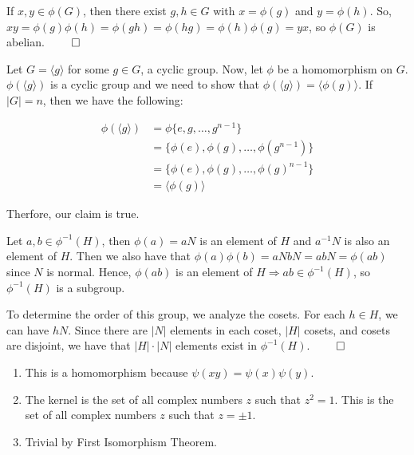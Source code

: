 \documentclass[12pt]{report}
\begin{document}
\sol If $x, y \in \phi(G)$, then there exist $g, h \in G$ with $x = \phi(g)$ and $y=\phi(h)$. So, $xy = \phi(g)\phi(h) = \phi(gh) = \phi(hg) = \phi(h)\phi(g) = yx$, so $\phi(G)$ is abelian. $\qed$

\sol Let $G = \langle g \rangle$ for some $g \in G$, a cyclic group. Now, let $\phi$ be a homomorphism on $G$. $\phi(\langle g \rangle)$ is a cyclic group and we need to show that $\phi(\langle g \rangle) = \langle \phi(g) \rangle$. If $|G| = n$, then we have the following:

\begin{align*}
    \phi(\langle g \rangle) &= \phi\{e, g, \ldots, g^{n-1}\}\\
    &= \{\phi(e), \phi(g), \ldots, \phi(g^{n-1})\} \\
    &= \{\phi(e), \phi(g), \ldots, \phi(g)^{n-1}\} \\
    &= \langle \phi(g) \rangle
\end{align*}

Therfore, our claim is true.

\sol Let $a,b \in \phi^{-1}(H)$, then $\phi(a) = aN$ is an element of $H$ and $a^{-1}N$ is also an element of $H$. Then we also have that $\phi(a)\phi(b) = aNbN = abN = \phi(ab)$ since $N$ is normal. Hence, $\phi(ab)$ is an element of $H \Rightarrow ab \in \phi^{-1}(H)$, so  $\phi^{-1}(H)$ is a subgroup. 

To determine the order of this group, we analyze the cosets. For each $h \in H$, we can have $hN$. Since there are $|N|$ elements in each coset, $|H|$ cosets, and cosets are disjoint, we have that $|H|\cdot|N|$ elements exist in $\phi^{-1}(H)$. $\qed$

\sol
\begin{enumerate}[label=\alph*.]
    \item This is a homomorphism because $\psi(xy) = \psi(x)\psi(y)$. 
    \item The kernel is the set of all complex numbers $z$ such that $z^2 = 1$. This is the set of all complex numbers $z$ such that $z = \pm 1$.
    \item Trivial by First Isomorphism Theorem.
\end{enumerate}
\end{document}
